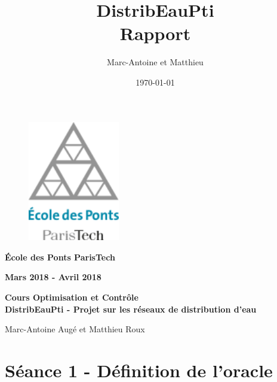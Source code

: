 \documentclass{article}
\title{DistribEauPti \\ Rapport}
\date{\today}
\author{\bsc{Augé} Marc-Antoine et \bsc{Roux} Matthieu}
\begin{document}
\thispagestyle{empty}
\begin{center}

    \begin{figure}[!htb]
        \begin{center}
            \includegraphics[width=4cm]{logoPonts.png}
        \end{center}
    \end{figure}
    
    \vspace{0.5cm}
    
    {\large{\bf École des Ponts ParisTech}}
    
    \vspace{0.2cm}
    
    {\large{\bf Mars 2018 - Avril 2018}}
    
    \vspace{1.5cm}
    
    \large{ \bf Cours Optimisation et Contrôle}\\
    \vspace{0.2cm}
    {\Large{\bf DistribEauPti - Projet sur les réseaux de distribution d'eau}}
    
    \vspace{1cm}
    
    \large{Marc-Antoine Augé et Matthieu Roux}

\end{center}
\newpage

\tableofcontents
 
\section{Séance 1 - Définition de l'oracle}
\end{document}
